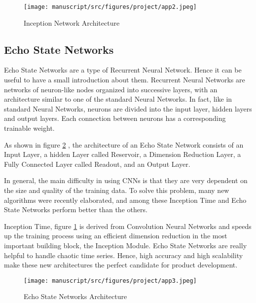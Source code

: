\begin{figure}[H]
    \centering
    \begin{minipage}[b]{\textwidth}
        \texttt{[image: manuscript/src/figures/project/app2.jpeg]}
    \end{minipage}
    \caption{Inception Network Architecture \cite{IsmailFawaz2020InceptionTime:Classification}}
    \label{fig:a2}
\end{figure}


\subsection{Echo State Networks}

Echo State Networks \cite{Bianchi2018ReservoirSeries} are a type of Recurrent Neural Network. Hence it can be useful to have a small introduction about them. Recurrent Neural Networks are networks of neuron-like nodes organized into successive layers, with an architecture similar to one of the standard Neural Networks. In fact, like in standard Neural Networks, neurons are divided into the input layer, hidden layers and output layers. Each connection between neurons has a corresponding trainable weight.  

As shown in figure \ref{fig:a3} , the architecture of an Echo State Network consists of an Input Layer, a hidden Layer called Reservoir, a Dimension Reduction Layer, a Fully Connected Layer called Readout, and an Output Layer.

In general, the main difficulty in using CNNs is that they are very dependent on the size and quality of the training data. To solve this problem, many new algorithms were recently elaborated, and among these Inception Time and Echo State Networks perform better than the others. 

Inception Time, figure \ref{fig:a2} is derived from Convolution Neural Networks and speeds up the training process using an efficient dimension reduction in the most important building block, the Inception Module. Echo State Networks are really helpful to handle chaotic time series. Hence, high accuracy and high scalability make these new architectures the perfect candidate for product development.
\begin{figure}[H]
    \centering
    \begin{minipage}[b]{\textwidth}
        \texttt{[image: manuscript/src/figures/project/app3.jpeg]}
    \end{minipage}
    \caption{Echo State Networks Architecture \cite{Bianchi2018ReservoirSeries}}
    \label{fig:a3}
\end{figure}